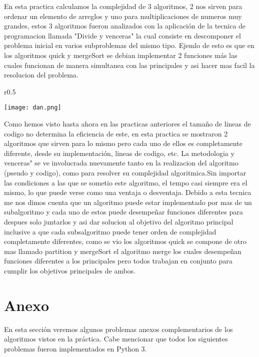 \documentclass[12pt,twoside]{article}
\begin{document}
En esta practica calculamos la complejidad de 3 algoritmos, 2 nos sirven para ordenar un elemento de arreglos y uno para multiplicaciones de numeros muy grandes, estos 3 algoritmos fueron analizados con la aplicaci\'on de la tecnica de programacion llamada "Divide y venceras" la cual consiste en descomponer el problema inicial en varios subproblemas del mismo tipo.
Ejemlo de esto es que en los algoritmos quick  y mergeSort se debian implementar 2 funciones m\'as las cuales funcionan de manera simultanea con las principales y asi hacer mas facil la resolucion del problema.
\begin{wrapfigure}{r}{0.5\textwidth}
  \begin{center}
    \texttt{[image: dan.png]}
\end{center}
\end{wrapfigure}
Como hemos visto hasta ahora en las practicas anteriores el tamaño de lineas de codigo no determina la eficiencia de este, en esta practica se mostraron 2 algoritmos que sirven para lo mismo pero cada uno de ellos es completamente diferente, desde su implementaci\'on, lineas de codigo, etc.
La metodologia \Divide y venceras" se ve involucrada nuevamente tanto en la realizacion del algoritmo (pseudo y codigo), como para resolver su complejidad algoritmica.Sin importar las condiciones a las que se sometio este algoritmo, el tempo casi siempre era el mismo, lo que puede verse como una ventaja o desventaja.
Debido a esta tecnica me nos dimos cuenta que un algoritmo puede estar implementado por mas de un subalgoritmo y cada uno de estos puede desempeñar funciones diferentes para despues solo juntarlos y asi dar solucion al objetivo del algoritmo principal inclusive a que cada subsalgoritmo puede tener orden de complejidad completamente diferentes, como se vio
los algoritmos quick se compone de otro mas llamado partition y mergeSort el algoritmo merge los cuales desempeñan funciones diferentes a los principales pero todos trabajan en conjunto para cumplir los objetivos principales de ambos.
\section{Anexo}
En esta sección veremos algunos problemas anexos complementarios de los algoritmos vistos en la práctica. Cabe mencionar que todos los siguientes problemas fueron implementados en Python 3.
\end{document}
